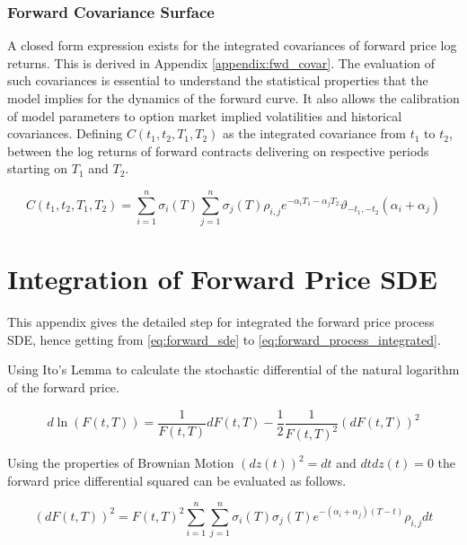 \documentclass{article}
\begin{document}
\subsubsection{Forward Covariance Surface}
A closed form expression exists for the integrated covariances of
forward price log returns. This is derived in Appendix \ref{appendix:fwd_covar}. The evaluation of such 
covariances is essential to
understand the statistical properties that the model implies for the dynamics of 
the forward curve. It also allows the calibration of model parameters to option
market implied volatilities and historical covariances. 
Defining $C(t_1, t_2, T_1, T_2)$
as the integrated covariance from $t_1$ to $t_2$, between the log returns of forward 
contracts delivering on respective periods starting on $T_1$ and $T_2$.

\begin{equation}
    C(t_1, t_2, T_1, T_2) = \sum_{i=1}^n \sigma_i(T) \sum_{j=1}^n \sigma_j(T) \rho_{i,j} 
    e^{-\alpha_i T_1 -\alpha_j T_2} \vartheta_{-t_1, -t_2}(\alpha_i + \alpha_j)
\end{equation}

\appendix
\appendixpage
\section{Integration of Forward Price SDE}
\label{appendix:forward_sde_integrate}
This appendix gives the detailed step for integrated the forward price process
SDE, hence getting from \ref{eq:forward_sde} to \ref{eq:forward_process_integrated}.

\bigskip

Using Ito's Lemma to calculate the stochastic differential of the natural logarithm
of the forward price.

\begin{equation}
    \label{eq:ln_forward_sde}
    d\ln(F(t, T)) = \frac{1}{F(t, T)} dF(t, T) - \frac{1}{2}
        \frac{1}{F(t, T)^2} (dF(t, T))^2
\end{equation}

Using the properties of Brownian Motion $(dz(t))^2=dt$ and $dtdz(t)=0$ the forward
price differential squared can be evaluated as follows.

\begin{equation}
    \label{eq:df_squared}
    (dF(t, T))^2 = F(t, T)^2 \sum_{i=1}^n \sum_{j=1}^n \sigma_i(T) \sigma_j(T)
    e^{-(\alpha_i + \alpha_j)(T-t)}\rho_{i,j}dt
\end{equation}
\end{document}
